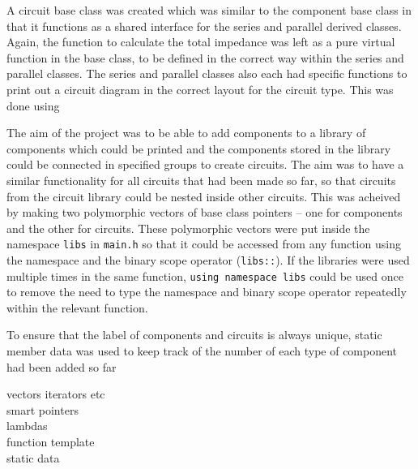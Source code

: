 A circuit base class was created which was similar to the component base class in that it functions as a shared interface for the series and parallel derived classes. Again, the function to calculate the total impedance was left as a pure virtual function in the base class, to be defined in the correct way within the series and parallel classes. The series and parallel classes also each had specific functions to print out a circuit diagram in the correct layout for the circuit type. This was done using

The aim of the project was to be able to add components to a library of components which could be printed and the components stored in the library could be connected in specified groups to create circuits. The aim was to have a similar functionality for all circuits that had been made so far, so that circuits from the circuit library could be nested inside other circuits. This was acheived by making two polymorphic vectors of base class pointers -- one for components and the other for circuits. These polymorphic vectors were put inside the namespace \verb!libs! in \verb!main.h! so that it could be accessed from any function using the namespace and the binary scope operator (\verb!libs::!). If the libraries were used multiple times in the same function, \verb!using namespace libs! could be used once to remove the need to type the namespace and binary scope operator repeatedly within the relevant function.

To ensure that the label of components and circuits is always unique, static member data was used to keep track of the number of each type of component had been added so far

vectors iterators etc\\
smart pointers\\
lambdas\\
function template\\
static data\\
